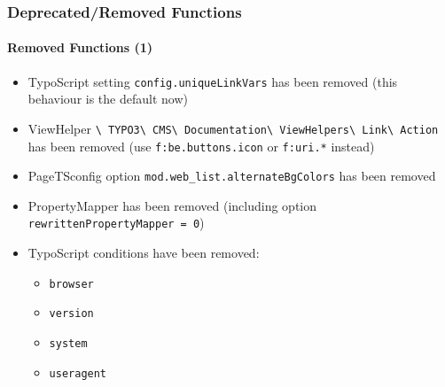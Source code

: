 \begin{frame}[fragile]
	\frametitle{Deprecated/Removed Functions}
	\framesubtitle{Removed Functions (1)}

	\begin{itemize}

		\item
			\small
				TypoScript setting \texttt{config.uniqueLinkVars} has been removed\newline
				(this behaviour is the default now)
			\normalsize

		\item
			\small
				ViewHelper
					\texttt{\textbackslash
						TYPO3\textbackslash
						CMS\textbackslash
						Documentation\textbackslash
						ViewHelpers\textbackslash
						Link\textbackslash
						Action}
					has been removed (use \texttt{f:be.buttons.icon} or \texttt{f:uri.*} instead)
			\normalsize

		\item
			\small
				PageTSconfig option \texttt{mod.web\_list.alternateBgColors}\newline
				has been removed
			\normalsize

		\item
			\small
				PropertyMapper has been removed\newline
				(including option \texttt{rewrittenPropertyMapper = 0})
			\normalsize

		\item
			\small
				TypoScript conditions have been removed:

					\begin{itemize}
						\item\texttt{browser}
						\item\texttt{version}
						\item\texttt{system}
						\item\texttt{useragent}
					\end{itemize}
			\normalsize

	\end{itemize}

\end{frame}


